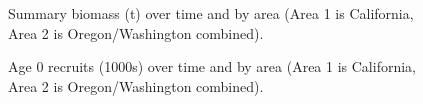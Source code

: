 \documentclass[
]{scrartcl}
\begin{document}
\begin{figure}


\caption{\label{fig-summbio}Summary biomass (t) over time and by area
(Area 1 is California, Area 2 is Oregon/Washington combined).}

\end{figure}%

\clearpage

\begin{figure}


\caption{\label{fig-tsrecuits}Age 0 recruits (1000s) over time and by
area (Area 1 is California, Area 2 is Oregon/Washington combined).}

\end{figure}%
\end{document}
